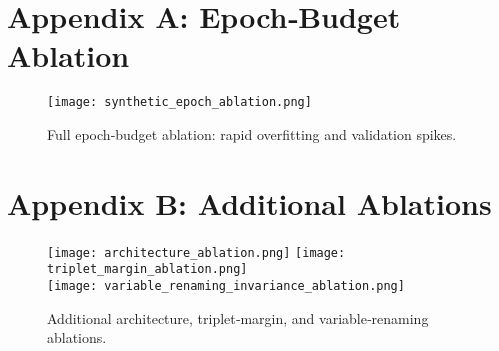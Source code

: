 
\appendix

\section{Appendix A: Epoch‐Budget Ablation}
\begin{figure}[h]
  \centering
  \texttt{[image: synthetic\_epoch\_ablation.png]}
  \caption{Full epoch‐budget ablation: rapid overfitting and validation spikes.}
  \label{fig:epoch-ablation-app}
\end{figure}

\section{Appendix B: Additional Ablations}
\begin{figure}[h]
  \centering
  \texttt{[image: architecture\_ablation.png]}
  \texttt{[image: triplet\_margin\_ablation.png]}\\[1ex]
  \texttt{[image: variable\_renaming\_invariance\_ablation.png]}
  \caption{Additional architecture, triplet‐margin, and variable‐renaming ablations.}
  \label{fig:other-ablations}
\end{figure}


